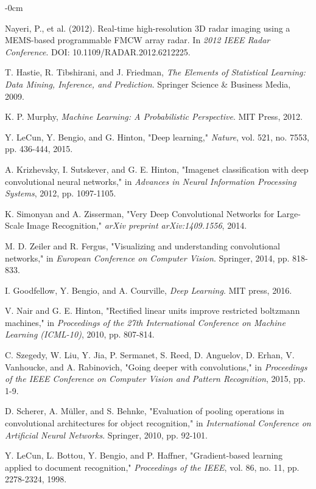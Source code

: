 \documentclass[journal,article,submit,pdftex,moreauthors]{Definitions/mdpi}
\begin{document}
\begin{adjustwidth}{-\extralength}{0cm}
\begin{thebibliography}{999}
 Nayeri, P., et al. (2012). Real-time high-resolution 3D radar imaging using a MEMS-based programmable FMCW array radar. In \textit{2012 IEEE Radar Conference}. DOI: 10.1109/RADAR.2012.6212225.

T. Hastie, R. Tibshirani, and J. Friedman, \textit{The Elements of Statistical Learning: Data Mining, Inference, and Prediction}. Springer Science \& Business Media, 2009.

K. P. Murphy, \textit{Machine Learning: A Probabilistic Perspective}. MIT Press, 2012.

Y. LeCun, Y. Bengio, and G. Hinton, "Deep learning," \textit{Nature}, vol. 521, no. 7553, pp. 436-444, 2015.

A. Krizhevsky, I. Sutskever, and G. E. Hinton, "Imagenet classification with deep convolutional neural networks," in \textit{Advances in Neural Information Processing Systems}, 2012, pp. 1097-1105.

K. Simonyan and A. Zisserman, "Very Deep Convolutional Networks for Large-Scale Image Recognition," \textit{arXiv preprint arXiv:1409.1556}, 2014.

M. D. Zeiler and R. Fergus, "Visualizing and understanding convolutional networks," in \textit{European Conference on Computer Vision}. Springer, 2014, pp. 818-833.

I. Goodfellow, Y. Bengio, and A. Courville, \textit{Deep Learning}. MIT press, 2016.


V. Nair and G. E. Hinton, "Rectified linear units improve restricted boltzmann machines," in \textit{Proceedings of the 27th International Conference on Machine Learning (ICML-10)}, 2010, pp. 807-814.

C. Szegedy, W. Liu, Y. Jia, P. Sermanet, S. Reed, D. Anguelov, D. Erhan, V. Vanhoucke, and A. Rabinovich, "Going deeper with convolutions," in \textit{Proceedings of the IEEE Conference on Computer Vision and Pattern Recognition}, 2015, pp. 1-9.

D. Scherer, A. Müller, and S. Behnke, "Evaluation of pooling operations in convolutional architectures for object recognition," in \textit{International Conference on Artificial Neural Networks}. Springer, 2010, pp. 92-101.

Y. LeCun, L. Bottou, Y. Bengio, and P. Haffner, "Gradient-based learning applied to document recognition," \textit{Proceedings of the IEEE}, vol. 86, no. 11, pp. 2278-2324, 1998.


\end{thebibliography}
\end{adjustwidth}
\end{document}
